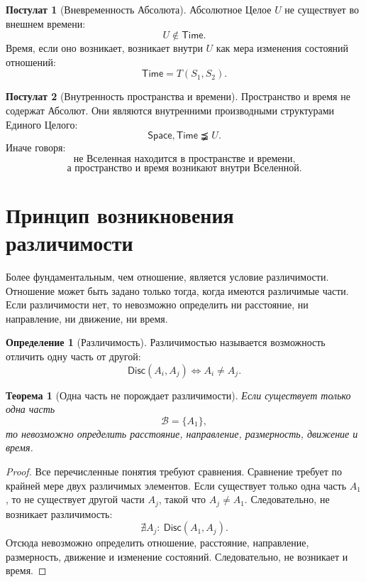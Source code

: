 \documentclass[12pt,a4paper,oneside]{book}
\theoremstyle{definition}
\newtheorem{definition}{Определение}[chapter]
\newtheorem{postulate}{Постулат}[chapter]
\theoremstyle{plain}
\newtheorem{theorem}{Теорема}[chapter]
\theoremstyle{remark}
\newcommand{\Whole}{U}
\newcommand{\SubParts}{\mathcal B}
\newcommand{\State}{S}
\newcommand{\Space}{\mathsf{Space}}
\newcommand{\Time}{\mathsf{Time}}
\newcommand{\Disc}{\mathsf{Disc}}
\begin{document}
\begin{postulate}[Вневременность Абсолюта]
Абсолютное Целое \(\Whole\) не существует во внешнем времени:
\[
\Whole \notin \Time.
\]
Время, если оно возникает, возникает внутри \(\Whole\) как мера изменения состояний отношений:
\[
\Time = T(\State_1,\State_2).
\]
\end{postulate}

\begin{postulate}[Внутренность пространства и времени]
Пространство и время не содержат Абсолют. Они являются внутренними производными структурами Единого Целого:
\[
\Space,\Time \precneqq \Whole.
\]
Иначе говоря:
\[
\boxed{\text{не Вселенная находится в пространстве и времени,}}
\]
\[
\boxed{\text{а пространство и время возникают внутри Вселенной.}}
\]
\end{postulate}

\section{Принцип возникновения различимости}

Более фундаментальным, чем отношение, является условие различимости. Отношение может быть задано только тогда, когда имеются различимые части. Если различимости нет, то невозможно определить ни расстояние, ни направление, ни движение, ни время.

\begin{definition}[Различимость]
Различимостью называется возможность отличить одну часть от другой:
\[
\Disc(A_i,A_j) \iff A_i\neq A_j.
\]
\end{definition}

\begin{theorem}[Одна часть не порождает различимости]
Если существует только одна часть
\[
\SubParts=\{A_1\},
\]
то невозможно определить расстояние, направление, размерность, движение и время.
\end{theorem}

\begin{proof}
Все перечисленные понятия требуют сравнения. Сравнение требует по крайней мере двух различимых элементов. Если существует только одна часть \(A_1\), то не существует другой части \(A_j\), такой что \(A_j\neq A_1\). Следовательно, не возникает различимость:
\[
\nexists A_j:\ \Disc(A_1,A_j).
\]
Отсюда невозможно определить отношение, расстояние, направление, размерность, движение и изменение состояний. Следовательно, не возникает и время.
\end{proof}
\end{document}
